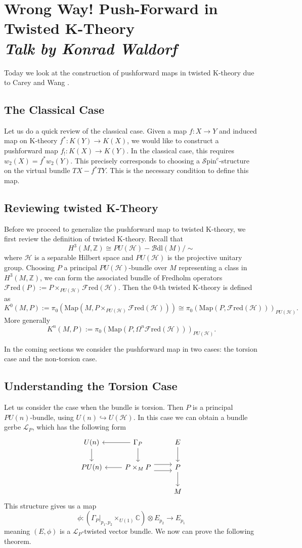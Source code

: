 \documentclass[a4paper]{book}
\newcommand{\lB}{\mathcal{B}}
\newcommand{\bC}{\mathbb{C}}
\newcommand{\lF}{\mathcal{F}}
\newcommand{\lH}{\mathcal{H}}
\newcommand{\lL}{\mathcal{L}}
\newcommand{\lS}{\mathcal{S}}
\newcommand{\bZ}{\mathbb{Z}}
\newcommand{\Bdl}{\lB\mathrm{dl}} %
\newcommand{\spin}{\lS\mathrm{pin}} %
\newcommand{\Fred}{\lF\mathrm{red}}
\theoremstyle{definition}
\theoremstyle{remark}
\numberwithin{equation}{section}
\begin{document}
\chapter{Wrong Way! Push-Forward in Twisted K-Theory \texorpdfstring{\\}{ } \normalsize \emph{Talk by Konrad Waldorf}}

Today we look at the construction of pushforward maps in twisted K-theory due to Carey and Wang \cite{careywang2008thomisomorphism}.

\section{The Classical Case}
Let us do a quick review of the classical case. Given a map $f\colon X \to Y$ and induced map on K-theory $f^*\colon K(Y) \to K(X)$, we would like to construct a pushforward map $f_!\colon K(X) \to K(Y)$. In the classical case, this requires $w_2(X)	= f^* w_2(Y)$. This precisely corresponds to choosing a $\spin^c$-structure on the virtual bundle $TX - f^* TY$. This is the necessary condition to define this map.

\section{Reviewing twisted K-Theory}
Before we proceed to generalize the pushforward map to twisted K-theory, we first review the definition of twisted K-theory. Recall that 
\[ H^3(M,\bZ) \cong PU(\lH) - \Bdl(M)/ \sim \] 
where $\lH$ is a separable Hilbert space and $PU(\lH)$ is the projective unitary group. Choosing $P$ a principal $PU(\lH)$-bundle over $M$ representing a class in $H^3(M,\bZ)$, we can form the associated bundle of Fredholm operators $\Fred(P) := P \times_{PU(\lH)} \Fred(\lH)$. Then the $0$-th twisted K-theory is defined as
\[K^0(M,P) := \pi_0(\mathrm{Map}(M, P\times_{PU(\lH)} \Fred(\lH))) \cong \pi_0(\mathrm{Map}(P, \Fred(\lH)))_{PU(\lH)}. \]
More generally 
\[ K^n(M,P) := \pi_0(\mathrm{Map}(P, \Omega^n \Fred(\lH)))_{PU(\lH)}. \]

In the coming sections we consider the pushforward map in two cases: the torsion case and the non-torsion case.

\section{Understanding the Torsion Case}
Let us consider the case when the bundle is torsion. Then $P$ is a principal $PU(n)$-bundle, using $U(n) \hookrightarrow	U(\lH)$. In this case we can obtain a bundle gerbe $\lL_P$, which has the following form 
 \[ 
	\begin{tikzcd}
	U(n) \arrow[d] & \Gamma_P \arrow[d] \arrow[l] & E \arrow[d] \\ 
	PU(n) & P \times_M P \arrow[l] \arrow[r, shift left = 1.8] \arrow[r, shift right = 1.8] & P \arrow[d] \\ 
	 & & M  
	\end{tikzcd}
	\]  
	This structure gives us a map 
	\[ 
	\phi\colon (\Gamma_P|_{p_1,p_2} \times_{U(1)} \bC) \otimes E_{p_2} \to E_{p_1}
	\]
	meaning $(E,\phi)$	is a $\lL_P$-twisted vector bundle.	We now can prove	the following theorem.
\end{document}
